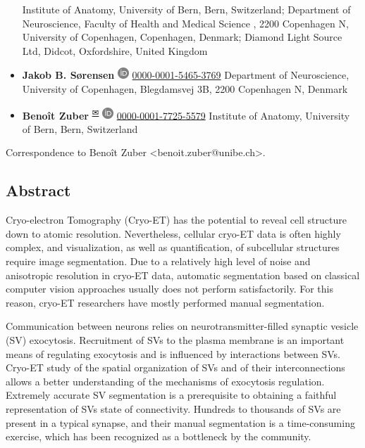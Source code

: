 \begin{itemize}
  Institute of Anatomy, University of Bern, Bern, Switzerland; Department of Neuroscience, Faculty of Health and Medical Science , 2200 Copenhagen N, University of Copenhagen, Copenhagen, Denmark; Diamond Light Source Ltd, Didcot, Oxfordshire, United Kingdom
\item
  \textbf{Jakob B. Sørensen}
  \includegraphics[width=0.16667in,height=0.16667in]{images/orcid.svg}
  \href{https://orcid.org/0000-0001-5465-3769}{0000-0001-5465-3769}
  Department of Neuroscience, University of Copenhagen, Blegdamsvej 3B, 2200 Copenhagen N, Denmark
\item
  \textbf{Benoît Zuber}
  \textsuperscript{\protect\hyperlink{correspondence}{✉}}
  \includegraphics[width=0.16667in,height=0.16667in]{images/orcid.svg}
  \href{https://orcid.org/0000-0001-7725-5579}{0000-0001-7725-5579}
  Institute of Anatomy, University of Bern, Bern, Switzerland
\end{itemize}

\leavevmode{}%
Correspondence to
Benoît Zuber \textless benoit.zuber@unibe.ch\textgreater.

\hypertarget{abstract}{%
\subsection{Abstract}\label{abstract}}

Cryo-electron Tomography (Cryo-ET) has the potential to reveal cell structure down to atomic resolution.
Nevertheless, cellular cryo-ET data is often highly complex, and visualization, as well as quantification, of subcellular structures require image segmentation.
Due to a relatively high level of noise and anisotropic resolution in cryo-ET data, automatic segmentation based on classical computer vision approaches usually does not perform satisfactorily.
For this reason, cryo-ET researchers have mostly performed manual segmentation.

Communication between neurons relies on neurotransmitter-filled synaptic vesicle (SV) exocytosis.
Recruitment of SVs to the plasma membrane is an important means of regulating exocytosis and is influenced by interactions between SVs.
Cryo-ET study of the spatial organization of SVs and of their interconnections allows a better understanding of the mechanisms of exocytosis regulation.
Extremely accurate SV segmentation is a prerequisite to obtaining a faithful representation of SVs state of connectivity.
Hundreds to thousands of SVs are present in a typical synapse, and their manual segmentation is a time-consuming exercise, which has been recognized as a bottleneck by the community.


